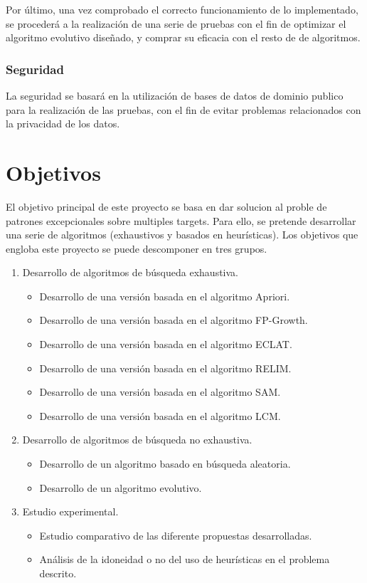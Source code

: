\documentclass[a4paper,12pt,twoside,final]{book}
\begin{document}
Por último, una vez comprobado el correcto funcionamiento de lo implementado, se procederá a la realización de una serie de pruebas con el fin de optimizar el algoritmo evolutivo diseñado, y comprar su eficacia con el resto de de algoritmos.\\

\subsubsection{Seguridad}
La seguridad se basará en la utilización de bases de datos de dominio publico para la realización de las pruebas, con el fin de evitar problemas relacionados con la privacidad de los datos.

\newpage
\section{Objetivos}
El objetivo principal de este proyecto se basa en dar solucion al proble de patrones excepcionales sobre multiples targets. Para ello, se pretende desarrollar una serie de algoritmos (exhaustivos y basados en heurísticas). Los objetivos que engloba este proyecto se puede descomponer en tres grupos.
\begin{enumerate}
    \item Desarrollo de algoritmos de búsqueda exhaustiva.
    \begin{itemize}
        \item Desarrollo de una versión basada en el algoritmo Apriori.
        \item Desarrollo de una versión basada en el algoritmo FP-Growth.
        \item Desarrollo de una versión basada en el algoritmo ECLAT.
        \item Desarrollo de una versión basada en el algoritmo RELIM.
        \item Desarrollo de una versión basada en el algoritmo SAM.
        \item Desarrollo de una versión basada en el algoritmo LCM.
    \end{itemize}
    \item Desarrollo de algoritmos de búsqueda no exhaustiva.
        \begin{itemize}
            \item Desarrollo de un algoritmo basado en búsqueda aleatoria.
            \item Desarrollo de un algoritmo evolutivo.
        \end{itemize}
    \item Estudio experimental.
        \begin{itemize}
            \item Estudio comparativo de las diferente propuestas desarrolladas.
            \item Análisis de la idoneidad o no del uso de heurísticas en el problema descrito.
        \end{itemize}
    
\end{enumerate}
\newpage
\end{document}
